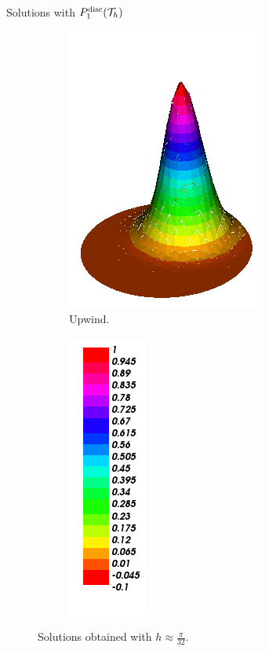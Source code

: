 \begin{frame}{Solutions with $\relax{P}^{\text{disc}}_1(\mathcal{T}_h)$}
\begin{figure}[h!]
\begin{subfigure}[b]{0.27\textwidth}
				\includegraphics[scale=0.18]{img/Conveccion_Reaccion/Recortes/steady_convect_react_approx_UPW_n_64.png}
				\caption{Upwind.}
			\end{subfigure}
			\begin{subfigure}[b]{0.15\textwidth}
				\centering
				\includegraphics[scale=0.18]{img/Conveccion_Reaccion/Recortes/steady_convect_react_values.png}
			\end{subfigure}
			\caption{Solutions obtained with $h\approx\frac{\pi}{32}$.}
		\end{figure}
		\end{frame}
		
